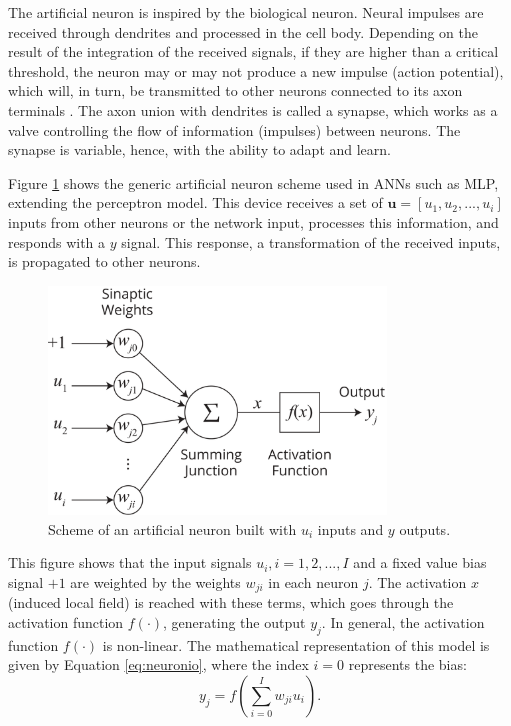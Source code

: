 The artificial neuron is inspired by the biological neuron. Neural impulses are received through dendrites and processed in the cell body. Depending on the result of the integration of the received signals, if they are %
higher than
a critical threshold, the neuron may or may not produce a new impulse (action potential), which will, in turn, be transmitted to other neurons connected to its axon terminals \cite{Castro2006FundamentalsON}. The axon union with dendrites is called a synapse, which works as a valve controlling the flow of information (impulses) between neurons. The synapse is variable, hence,
with
the ability to adapt and learn.

Figure \ref{fig:neuronio} shows the generic artificial neuron scheme used in ANNs such as MLP, extending the perceptron model. This device receives a set of $\textbf{u} = [ u_1 , u_2 ,..., u_i]$ inputs from other neurons or the network input, processes this information, and responds with a $y$ signal. This response, a transformation of the received inputs, is propagated to other neurons.

\begin{figure}[h!]
	\caption{Scheme of an artificial neuron built with $u_i$ inputs and $y$ outputs.}
	\vspace{0.2cm}
	\begin{center}
		\includegraphics[width=0.8\textwidth]{neuronioArtificial.png}
	\end{center}
	\label{fig:neuronio}
\end{figure}

This figure shows that the input signals $u_i , i=1, 2,..., I$ and a fixed value bias signal $+1$ are weighted by the weights $w_{ji}$ in each neuron $j$. The activation $x$ (induced local field) is reached with these terms, which goes through the activation function $f(\cdot)$, generating the output $y_j$. In general, the activation function $f(\cdot)$ is non-linear. The mathematical representation of this model is given by Equation \ref{eq:neuronio}, %
where
the index $i=0$ represents the bias:
\begin{equation}
    \label{eq:neuronio}
    y_j = f \left( \sum_{i=0}^I w_{ji} u_i  \right).
\end{equation}

